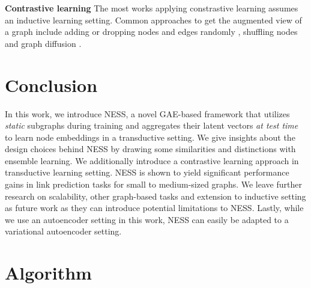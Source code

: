 \documentclass{article}
\begin{document}
\textbf{Contrastive learning} The most works applying constrastive learning assumes an inductive learning setting.  Common approaches to get the augmented view of a graph include adding or dropping nodes and edges randomly \citep{xu2021infogcl, you2020graph, zhu2020deep, papp2021dropgnn, rong2020dropedge}, shuffling nodes \citep{velickovic2019deep} and graph diffusion \cite{hassani2020contrastive}.






\section{Conclusion}
In this work, we introduce NESS, a novel GAE-based framework that utilizes \textit{static} subgraphs during training and aggregates their latent vectors \textit{at test time} to learn node embeddings in a transductive setting. We give insights about the design choices behind NESS by drawing some similarities and distinctions with ensemble learning. We additionally introduce a contrastive learning approach in transductive learning setting. NESS is shown to yield significant performance gains in link prediction tasks for small to medium-sized graphs. We leave further research on scalability, other graph-based tasks and extension to inductive setting as future work as they can introduce potential limitations to NESS. Lastly, while we use an autoencoder setting in this work, NESS can easily be adapted to a variational autoencoder setting.




\clearpage




\newpage
\appendix

\renewcommand\thefigure{A\arabic{figure}}
\renewcommand\thetable{A\arabic{table}}
\setcounter{figure}{0} 
\setcounter{table}{0} 


\section{Algorithm}
\end{document}
